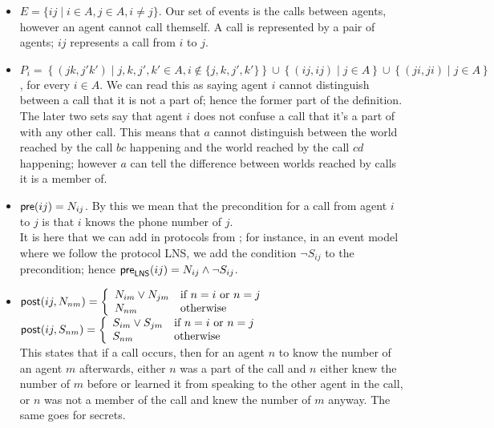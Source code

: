 \documentclass[10pt, a4paper]{report}
\begin{document}
\begin{itemize}
\item $E = \{ij \mid i \in A, j \in A, i \not = j\}$. Our set of events is the
  calls between agents, however an agent cannot call themself. A call is
  represented by a pair of agents; $ij$ represents a call from $i$ to $j$.
\item $P_i = \left\{(jk, j'k') \mid j, k, j', k' \in A, i \not \in \{j, k, j',
    k'\}\right\} \cup \left\{ (ij, ij) \mid j \in A\right\} \cup \left\{ (ji,
    ji) \mid j \in A \right\}$, for every $i \in A$. We can read this as saying
  agent $i$ cannot distinguish between a call that it is not a part of; hence
  the former part of the definition. The later two sets say that agent $i$ does
  not confuse a call that it's a part of with any other call. This means that
  $a$ cannot distinguish between the world reached by the call $bc$ happening
  and the world reached by the call $cd$ happening; however $a$ can tell the
  difference between worlds reached by calls it is a member of.
\item $\textsf{pre}(ij) = N_{ij}$. By this we mean that the precondition for a call from
  agent $i$ to $j$ is that $i$ knows the phone number of $j$. \\
  It is here that we
  can add in protocols from ; for instance, in an event
  model where we follow the protocol \textsf{LNS}, we add the condition $\neg
  S_{ij}$ to the precondition; hence $\textsf{pre}_{\textsf{LNS}}(ij) = N_{ij} \land
  \neg S_{ij}$.
\item $\textsf{post}(ij, N_{nm}) = \left\{ \begin{array}{ll}
                                     N_{im} \lor N_{jm} & \text{if $n = i$ or $n =
                                                     j$} \\
                                     N_{nm} & \text{otherwise} 
                                   \end{array}
                           \right.$ \\
$\textsf{post}(ij, S_{nm}) = \left\{ \begin{array}{ll}
                                     S_{im} \lor S_{jm} & \text{if $n = i$ or $n =
                                                     j$} \\
                                     S_{nm} & \text{otherwise} 
                                   \end{array}
                           \right.$ \\
 This states that if a call occurs, then for an agent $n$ to know the number of
 an agent $m$ afterwards, either $n$ was a part of the call and $n$ either knew the number
 of $m$ before or learned it from speaking to the other agent in the call, or
 $n$ was not a member of the call and knew the number of $m$ anyway. The same
 goes for secrets. 
\end{itemize}
\end{document}
